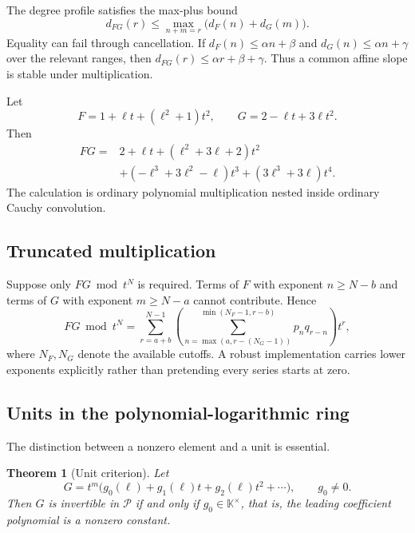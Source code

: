 \documentclass[11pt,oneside]{article}
\numberwithin{equation}{section}
\newtheorem{theorem}{Theorem}[section]
\theoremstyle{definition}
\newcommand{\K}{\mathbb K}
\newcommand{\PL}{\mathscr P}
\begin{document}
The degree profile satisfies the max-plus bound
\begin{equation}\label{eq:degree-convolution}
  d_{FG}(r)\le
  \max_{n+m=r}\bigl(d_F(n)+d_G(m)\bigr).
\end{equation}
Equality can fail through cancellation.  If
\(d_F(n)\le\alpha n+\beta\) and
\(d_G(n)\le\alpha n+\gamma\) over the relevant ranges, then
\(d_{FG}(r)\le\alpha r+\beta+\gamma\).  Thus a common affine slope is stable
under multiplication.

\begin{examplebox}
Let
\[
 F=1+\ell t+(\ell^2+1)t^2,
 \qquad
 G=2-\ell t+3\ell t^2.
\]
Then
\begin{align*}
 FG={}&2+\ell t+(\ell^2+3\ell+2)t^2\\
 &+(-\ell^3+3\ell^2-\ell)t^3
 +(3\ell^3+3\ell)t^4.
\end{align*}
The calculation is ordinary polynomial multiplication nested inside ordinary
Cauchy convolution.
\end{examplebox}

\subsection{Truncated multiplication}

Suppose only \(FG\bmod t^N\) is required.  Terms of \(F\) with exponent
\(n\ge N-b\) and terms of \(G\) with exponent \(m\ge N-a\) cannot contribute.
Hence
\begin{equation}\label{eq:truncated-product}
  FG\bmod t^N
  =\sum_{r=a+b}^{N-1}
    \left(\sum_{n=\max(a,r-(N_G-1))}^{\min(N_F-1,r-b)}p_nq_{r-n}\right)t^r,
\end{equation}
where \(N_F,N_G\) denote the available cutoffs.  A robust implementation carries
lower exponents explicitly rather than pretending every series starts at zero.

\subsection{Units in the polynomial-logarithmic ring}

The distinction between a nonzero element and a unit is essential.

\begin{theorem}[Unit criterion]\label{thm:unit-criterion}
Let
\[
  G=t^m\bigl(g_0(\ell)+g_1(\ell)t+g_2(\ell)t^2+\cdots\bigr),
  \qquad g_0\ne0.
\]
Then \(G\) is invertible in \(\PL\) if and only if
\(g_0\in\K^\times\), that is, the leading coefficient polynomial is a nonzero
constant.
\end{theorem}
\end{document}

